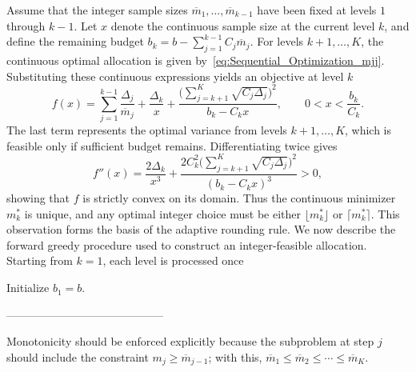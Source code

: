 Assume that the integer sample sizes $\overline{m}_1,\ldots,\overline{m}_{k-1}$ have been fixed at levels $1$ through $k-1$. Let $x$ denote the continuous sample size at the current level $k$, and define the remaining budget $b_k = b - \sum_{j=1}^{k-1} C_j \overline{m}_j$. For levels $k+1,\ldots,K$, the continuous optimal allocation is given by~\eqref{eq:Sequential_Optimization_mjj}. Substituting these continuous expressions yields an objective at level $k$
%
\begin{equation}\label{eq:Objective_adaptive_strategy}
    f(x)=\sum_{j=1}^{k-1}\frac{\Delta_j}{\overline{m}_j}
    + \frac{\Delta_k}{x}
    + \frac{\Big(\sum_{j=k+1}^K \sqrt{C_j\Delta_j}\Big)^2}
    {\,b_k - C_k x\,},
    \qquad 0 < x < \frac{b_k}{C_k}.
\end{equation}
%
The last term represents the optimal variance from levels $k+1,\ldots,K$, which is feasible only if sufficient budget remains. Differentiating twice gives
%
\[
f''(x)
= \frac{2\Delta_k}{x^3}
+ \frac{2C_k^2\Big(\sum_{j=k+1}^K \sqrt{C_j\Delta_j}\Big)^2}
{(b_k - C_k x)^3}
> 0,
\]
%
showing that $f$ is strictly convex on its domain. Thus the continuous minimizer $m_k^*$ is unique, and any optimal integer choice must be either $\lfloor m_k^* \rfloor$ or $\lceil m_k^* \rceil$. This observation forms the basis of the adaptive rounding rule. We now describe the forward greedy procedure used to construct an integer-feasible allocation. Starting from $k=1$, each level is processed once
%
\begin{algorithm}[!ht]
 Initialize $b_1 = b$.
 
\end{algorithm}

------------------------------------------

Monotonicity should be enforced explicitly because the subproblem at step $j$ should include the constraint $m_j \ge \overline{m}_{j-1}$; with this, $\overline{m}_1 \le \overline{m}_2 \le \cdots \le \overline{m}_K$.

